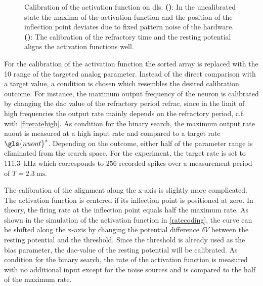\begin{figure}[tb!]
	\centering
	\begin{subfigure}[b]{0.49\textwidth}
		\caption{}
		
		\label{transferfunction_wout_calib}
	\end{subfigure}
	\begin{subfigure}[b]{0.49\textwidth}		
		\caption{}
		
		\label{transferfunction_w_calib}
	\end{subfigure}
	\caption[Calibration of the sigmoid activation function on \acrshort{dls}.]{Calibration of the activation function on \acrshort{dls}. \textbf{()}: In the uncalibrated state the maxima of the activation function and the position of the inflection point deviates due to fixed pattern noise of the hardware. \textbf{()}: The calibration of the refractory time and the resting potential aligns the activation functions well.}
\end{figure}

For the calibration of the activation function the sorted array is replaced with the \SI{10}{\bit} range of the targeted analog parameter. Instead of the direct comparison with a target value, a condition is chosen which resembles the desired calibration outcome. For instance, the maximum output frequency of the neuron is calibrated
by changing the \gls{dac} value of the refractory period \gls{refrac}, since in the limit of high frequencies the output rate mainly depends on the refractory period, c.f. with \cref{fireratehigh}. As condition for the binary search, the maximum output rate \gls{nuout} is measured at a high input rate and compared to a target rate $\gls{nuout}^*$. Depending on the outcome, either half of the parameter range is eliminated from the search space.
For the experiment, the target rate is set to \SI{111.3}{\kilo \Hz} which corresponds to $256$ recorded spikes over a measurement period of $T=\SI{2.3}{\milli \s}$.

The calibration of the alignment along the x-axis is slightly more complicated. The activation function is centered if its inflection point is positioned at zero. In theory, the firing rate at the inflection point equals half the maximum rate. As shown in the simulation of the activation function in \cref{ratecoding}, the curve can be shifted along the x-axis by changing the potential difference $\delta V$ between the resting potential and the threshold. Since the threshold is already used as the bias parameter, the \gls{dac}-value of the resting potential will be calibrated. As condition for the binary search, the rate of the activation function is measured with no additional input except for the noise sources and is compared to the half of the maximum rate.

